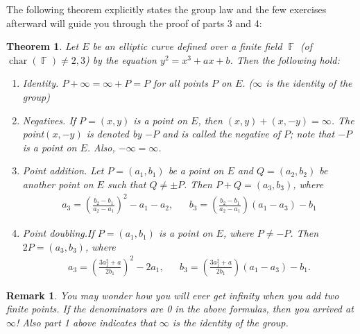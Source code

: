 \documentclass[12 pt]{article}
\newtheorem{theorem}{Theorem}
\newtheorem{remark}{Remark}
\DeclareMathOperator{\F}{\mathbb{F}}
\newcounter{exercise}[section]
\begin{document}
\begin{center}
\end{center}

The following theorem explicitly states the group law and the few exercises afterward will guide you through the proof of parts 3 and 4:

\begin{theorem}
Let $E$ be an elliptic curve defined over a finite field $\F$ (of $\operatorname{char}(\F)\not =2,3$) by the equation $y^2=x^3+ax+b$. Then the following hold:
\begin{enumerate}
\item \emph{Identity}. $P+\infty=\infty+P=P$ for all points $P$ on $E$. ($\infty$ is the identity of the group)
\item \emph{Negatives}. If $P=(x,y)$ is a point on $E$, then $(x,y)+(x,-y)=\infty$. The point$(x,-y)$ is denoted by $-P$ and is called the negative of $P$; note that $-P$ is a point on $E$. Also, $-\infty=\infty$.
\item \emph{Point addition}. Let $P=(a_1,b_1)$ be a point on $E$ and $Q=(a_2,b_2)$ be another point on $E$ such that $Q\not = \pm P$. Then $P+Q=(a_3,b_3)$, where
\begin{align*}
a_3=\left(\frac{b_2-b_1}{a_2-a_1}\right)^2-a_1-a_2, && b_3=\left(\frac{b_2-b_1}{a_2-a_1}\right)(a_1-a_3)-b_1
\end{align*}
\item \emph{Point doubling}.If $P=(a_1,b_1)$ is a point on $E$, where $P\not =-P$. Then $2P=(a_3,b_3)$, where
\begin{align*}
a_3=\left(\frac{3a_1^2+a}{2b_1}\right)^2-2a_1, && b_3=\left(\frac{3a_1^2+a}{2b_1}\right)(a_1-a_3)-b_1.
\end{align*}
\end{enumerate}
\end{theorem}

\begin{remark}
You may wonder how you will ever get infinity when you add two finite points. If the denominators are 0 in the above formulas, then you arrived at $\infty$! Also part 1 above indicates that $\infty$ is the identity of the group. 
\end{remark}
\end{document}
